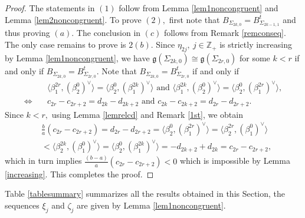 \documentclass[12pt,reqno]{amsart}
\theoremstyle{plain}
\theoremstyle{definition}
\theoremstyle{remark}
\newcommand{\lie}[1]{\mathfrak{#1}}
\newcommand\bz{\mathbb Z}
\begin{document}
\begin{proof}
    The statements in $(1)$ follow from Lemma \ref{lem1noncongruent} and Lemma \ref{lem2noncongruent}. To prove $(2),$ first note that $B_{\Sigma_{2k,0}}=B_{\Sigma_{2k-1,1}}^t$ and thus proving $(a).$ The conclusion in $(c)$ follows from Remark \ref{remconseq}. The only case remains to prove is $2(b).$ Since $\eta_{2j},\ j\in\bz_+$ is strictly increasing by Lemma \ref{lem1noncongruent}, we have $\lie g(\Sigma_{2k,0})\cong \lie g(\Sigma_{2r,0})$ for some $k<r$ if and only if $B_{\Sigma_{2k,0}}=B_{\Sigma_{2r,0}}^t.$ Note that $B_{\Sigma_{2k,0}}=B_{\Sigma_{2r,0}}^t$ if and only if \begin{align*}
    &\quad \langle\beta_1^{2r},(\beta_2^{0})^\vee\rangle=\langle\beta_2^0,(\beta_1^{2k})^\vee\rangle \text{ and  } \langle\beta_1^{2k},(\beta_2^{0})^\vee\rangle=\langle\beta_2^0,(\beta_1^{2r})^\vee\rangle,\\
    \Longleftrightarrow &\quad c_{2r}-c_{2r+2}=d_{2k}-d_{2k+2} \text{ and } c_{2k}-c_{2k+2}=d_{2r}-d_{2r+2}.
    \end{align*}
    Since $k<r,$ using Lemma \ref{lemrelcd} and Remark \ref{1st}, we obtain 
    \begin{align*}
        &\frac{b}{a}(c_{2r}-c_{2r+2})=d_{2r}-d_{2r+2}=\langle\beta_2^0,(\beta_1^{2r})^\vee\rangle=\langle\beta_2^{2r},(\beta_1^{0})^\vee\rangle\\
        &<\langle\beta_2^{2k},(\beta_1^{0})^\vee\rangle=\langle\beta_2^0,(\beta_1^{2k})^\vee\rangle=-d_{2k+2}+d_{2k}=c_{2r}-c_{2r+2},
    \end{align*}
    which in turn implies $\frac{(b-a)}{a}(c_{2r}-c_{2r+2})<0$
    which is impossible by Lemma \ref{increasing}. This completes the proof.
\end{proof}

Table \ref{tablesummary} summarizes all the results obtained in this Section, the sequences $\xi_j$ and $\zeta_j$ are given by Lemma \ref{lem1noncongruent}.

\medskip
\end{document}
